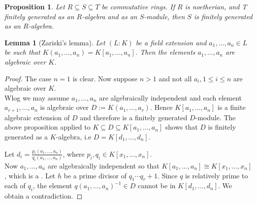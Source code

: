 \documentclass[12pt]{article}
\newtheorem{prop*}{Proposition}
\newtheorem{lem*}{Lemma}
\begin{document}
\begin{prop*} Let $R\subseteq S\subseteq T$ be commutative rings. If $R$ is noetherian, and T finitely generated as an $R$-algebra and as an $S$-module, then $S$ is finitely generated as an $R$-algebra.
\end{prop*}
\begin{lem*}[Zariski's lemma]
 Let $(L:K)$ be a field extension and $a_1,\ldots,a_n\in L$ be such that $K(a_1,\ldots,a_n)=K[a_1,\ldots,a_n]$. Then the elements $a_1,\ldots,a_n$ are algebraic over $K$.\end{lem*}
\begin{proof}
The case $n=1$ is clear. Now suppose $n>1$ and not all $a_i,1\leq i\leq n$ are algebraic over $K$.\\ Wlog we may assume $a_1,\ldots,a_n$ are algebraically independent and each element $a_{r+1},\ldots,a_n$ is algebraic over $D:=K(a_1,\ldots,a_r)$. Hence $K[a_1,\ldots,a_n]$ is a finite algebraic extension of $D$ and therefore is a finitely generated $D$-module.\newline
 The above proposition applied to $K\subseteq D\subseteq K[a_1,\ldots,a_n]$ shows that $D$ is finitely generated as a $K$-algebra, i.e $D=K[d_1,\ldots,d_n]$.\newline


 Let $d_i=\frac{p_i(a_1,\ldots,a_n)}{q_i(a_1,\ldots,a_n)}$, where $p_i,q_i\in K[x_1,\ldots,x_n]$.\\ Now $a_1,\ldots,a_n$ are algebraically independent so that $K[a_1,\ldots,a_n]\cong K[x_1,\ldots,x_n]$, which is a .\newline
 Let $h$ be a prime divisor of $q_1\cdots q_r+1$. Since $q$ is relatively prime to each of $q_i$, the element ${q(a_1,\ldots,a_n)}^{-1} \in D$ cannot be in $K[d_1,\ldots,d_n]$. We obtain a contradiction.
\end{proof}
\end{document}
